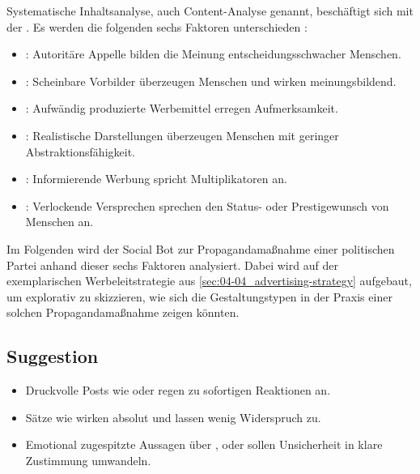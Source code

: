Systematische Inhaltsanalyse, auch Content-Analyse genannt, beschäftigt sich mit der  \cite[S. 39 f.]{002_MKO03_communication-communication-goals-and-advertising-conception}. Es werden die folgenden sechs Faktoren unterschieden \cite[S. 39 f.]{002_MKO03_communication-communication-goals-and-advertising-conception}:

\begin{itemize}
    \item \textbf{}: \linebreak Autoritäre Appelle bilden die Meinung entscheidungsschwacher Menschen.
    \item \textbf{}: \linebreak Scheinbare Vorbilder überzeugen Menschen und wirken meinungsbildend.
    \item \textbf{}: \linebreak Aufwändig produzierte Werbemittel erregen Aufmerksamkeit.
    \item \textbf{}: \linebreak Realistische Darstellungen überzeugen Menschen mit geringer Abstraktionsfähigkeit.
    \item \textbf{}: \linebreak Informierende Werbung spricht Multiplikatoren an.
    \item \textbf{}: \linebreak Verlockende Versprechen sprechen den Status- oder Prestigewunsch von Menschen an.
\end{itemize}

Im Folgenden wird der Social Bot zur Propagandamaßnahme einer politischen Partei anhand dieser sechs Faktoren analysiert. Dabei wird auf der exemplarischen Werbeleitstrategie aus \autoref{sec:04-04_advertising-strategy} aufgebaut, um explorativ zu skizzieren, wie sich die Gestaltungstypen in der Praxis einer solchen Propagandamaßnahme zeigen könnten.

\subsection{Suggestion}
\label{sec:04-05-01_suggestion}

\begin{itemize}
    \item Druckvolle Posts wie  oder  regen zu sofortigen Reaktionen an.
    \item Sätze wie  wirken absolut und lassen wenig Widerspruch zu.
    \item Emotional zugespitzte Aussagen über ,  oder  sollen Unsicherheit in klare Zustimmung umwandeln.
\end{itemize}

